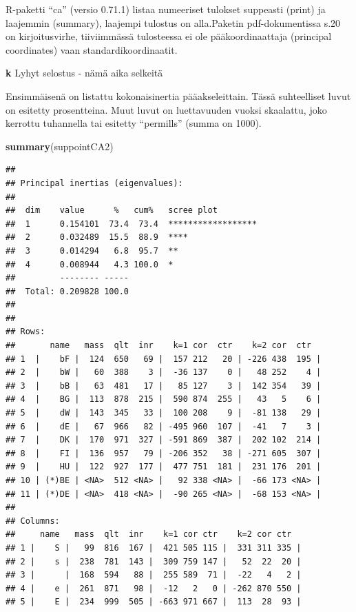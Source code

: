 \documentclass[
  finnish,
]{book}
\newenvironment{Shaded}{\begin{snugshade}}{\end{snugshade}}
\newcommand{\KeywordTok}[1]{\textcolor[rgb]{0.13,0.29,0.53}{\textbf{#1}}}
\newcommand{\NormalTok}[1]{#1}
\begin{document}
R-paketti ``ca'' (versio 0.71.1) listaa numeeriset tulokset suppeasti (print) ja laajemmin
(summary), laajempi tulostus on alla.Paketin pdf-dokumentissa s.20 on kirjoitusvirhe, tiiviimmässä
tulosteessa ei ole pääkoordinaattaja (principal coordinates) vaan standardikoordinaatit.

\textbf{k} Lyhyt selostus - nämä aika selkeitä

Ensimmäisenä on listattu kokonaisinertia pääakseleittain. Tässä suhteelliset luvut
on esitetty prosentteina. Muut luvut on luettavuuden vuoksi skaalattu, joko kerrottu
tuhannella tai esitetty ``permills'' (summa on 1000).

\begin{Shaded}
\begin{Highlighting}[]
\KeywordTok{summary}\NormalTok{(suppointCA2)}
\end{Highlighting}
\end{Shaded}

\begin{verbatim}
## 
## Principal inertias (eigenvalues):
## 
##  dim    value      %   cum%   scree plot               
##  1      0.154101  73.4  73.4  ******************       
##  2      0.032489  15.5  88.9  ****                     
##  3      0.014294   6.8  95.7  **                       
##  4      0.008944   4.3 100.0  *                        
##         -------- -----                                 
##  Total: 0.209828 100.0                                 
## 
## 
## Rows:
##       name   mass  qlt  inr    k=1 cor  ctr    k=2 cor  ctr  
## 1  |    bF |  124  650   69 |  157 212   20 | -226 438  195 |
## 2  |    bW |   60  388    3 |  -36 137    0 |   48 252    4 |
## 3  |    bB |   63  481   17 |   85 127    3 |  142 354   39 |
## 4  |    BG |  113  878  215 |  590 874  255 |   43   5    6 |
## 5  |    dW |  143  345   33 |  100 208    9 |  -81 138   29 |
## 6  |    dE |   67  966   82 | -495 960  107 |  -41   7    3 |
## 7  |    DK |  170  971  327 | -591 869  387 |  202 102  214 |
## 8  |    FI |  136  957   79 | -206 352   38 | -271 605  307 |
## 9  |    HU |  122  927  177 |  477 751  181 |  231 176  201 |
## 10 | (*)BE | <NA>  512 <NA> |   92 338 <NA> |  -66 173 <NA> |
## 11 | (*)DE | <NA>  418 <NA> |  -90 265 <NA> |  -68 153 <NA> |
## 
## Columns:
##     name   mass  qlt  inr    k=1 cor ctr    k=2 cor ctr  
## 1 |    S |   99  816  167 |  421 505 115 |  331 311 335 |
## 2 |    s |  238  781  143 |  309 759 147 |   52  22  20 |
## 3 |      |  168  594   88 |  255 589  71 |  -22   4   2 |
## 4 |    e |  261  871   98 |  -12   2   0 | -262 870 550 |
## 5 |    E |  234  999  505 | -663 971 667 |  113  28  93 |
\end{verbatim}
\end{document}
